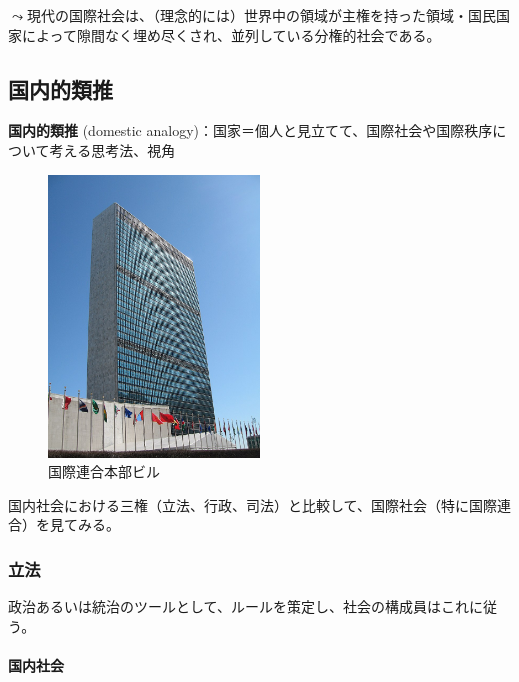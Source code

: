 \documentclass[
  xelatex,
  ja=standard]{bxjsarticle}
\let\oldparagraph\paragraph
\renewcommand{\paragraph}[1]{\oldparagraph{#1}\mbox{}}
\begin{document}
\(\leadsto\)現代の国際社会は、（理念的には）世界中の領域が主権を持った領域・国民国家によって隙間なく埋め尽くされ、並列している分権的社会である。

\hypertarget{ux56fdux5185ux7684ux985eux63a8}{%
\subsection{国内的類推}\label{ux56fdux5185ux7684ux985eux63a8}}

\textbf{国内的類推} (domestic
analogy)：国家＝個人と見立てて、国際社会や国際秩序について考える思考法、視角\citetext{\citealp[p.174]{nakanishi2013}; \citealp[p.39-46]{shinoda2007}}

\begin{figure}[htpb]

{\centering \includegraphics[width=0.5\textwidth,height=\textheight]{international_society_files/mediabag/800px-UNHQ_NYC.jpg}

}

\caption{国際連合本部ビル}

\end{figure}

国内社会における三権（立法、行政、司法）と比較して、国際社会（特に国際連合）を見てみる。

\hypertarget{ux7acbux6cd5}{%
\subsubsection{立法}\label{ux7acbux6cd5}}

政治あるいは統治のツールとして、ルールを策定し、社会の構成員はこれに従う。

\hypertarget{ux56fdux5185ux793eux4f1a}{%
\paragraph{国内社会}\label{ux56fdux5185ux793eux4f1a}}
\end{document}
